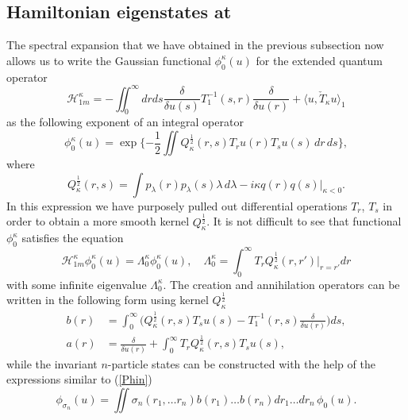 \documentclass[12pt]{article}
\newcommand{\HH}{\mathscr{H}}
\begin{document}
\subsection{Hamiltonian eigenstates at
}
	The spectral expansion that we have obtained in the previous subsection
	now allows us to write the Gaussian functional
$ \phi_{0}^{\kappa}(u) $
	for the extended quantum operator
\begin{equation*}
    \HH_{1m}^{\kappa} = -\iint_{0}^{\infty} dr ds
    \frac{\delta}{\delta u(s)} T_{1}^{-1}(s,r)
	\frac{\delta}{\delta u(r)}
	+ \langle u, \check{T}_{\kappa}u\rangle_{1}
\end{equation*}
	as the following exponent of an integral operator
\begin{equation*}
    \phi_{0}^{\kappa}(u)
	= \exp\{-\frac{1}{2} \iint Q_{\kappa}^{\frac{1}{2}}(r,s)
	T_{r}u(r) T_{s}u(s) \, dr\,ds\} ,
\end{equation*}
	where
\begin{equation*}
    Q_{\kappa}^{\frac{1}{2}}(r,s) = \int p_{\lambda}(r) p_{\lambda}(s)
	\lambda\,d\lambda - i\kappa q(r)q(s) \bigr|_{\kappa <0} .
\end{equation*}
	In this expression we have purposely pulled out differential operations
$ T_{r} $, 
$ T_{s} $
	in order to obtain a more smooth kernel
$ Q_{\kappa}^{\frac{1}{2}} $.
	It is not difficult to see that functional
$ \phi_{0}^{\kappa} $
	satisfies the equation
\begin{equation*}
    \HH_{1m}^{\kappa} \phi_{0}^{\kappa}(u)
	= \Lambda_{0}^{\kappa} \phi_{0}^{\kappa}(u) ,\quad
    \Lambda_{0}^{\kappa} = \int_{0}^{\infty} T_{r}
	Q_{\kappa}^{\frac{1}{2}}(r,r') |_{r=r'} dr
\end{equation*}
	with some infinite eigenvalue
$ \Lambda_{0}^{\kappa} $.
	The creation and annihilation operators can be
	written in the following form using kernel
$ Q_{\kappa}^{\frac{1}{2}} $
\begin{align*}
    b(r) &= \int_{0}^{\infty} \bigl( Q_{\kappa}^{\frac{1}{2}}(r,s)T_{s}u(s)
	- T_{1}^{-1}(r,s) \frac{\delta}{\delta u(r)} \bigr) ds , \\
    a(r) &= \frac{\delta}{\delta u(r)} + \int_{0}^{\infty} 
	T_{r} Q_{\kappa}^{\frac{1}{2}}(r,s) T_{s} u(s) ,
\end{align*}
	while the invariant
$ n $-particle states can be constructed with the help of the expressions
    similar to
(\ref{Phin})
\begin{equation*}
    \phi_{\sigma_{n}}(u) = \iint
    \sigma_{n} (r_{1},\ldots r_{n})
	b(r_{1}) \ldots b(r_{n})
    dr_{1} \ldots dr_{n} \, \phi_{0}(u) .
\end{equation*}
\end{document}
